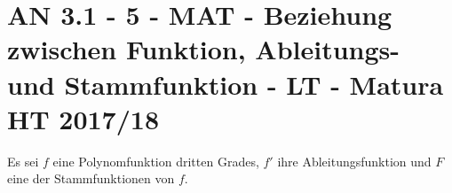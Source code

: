 \section{AN 3.1 - 5 - MAT - Beziehung zwischen Funktion, Ableitungs- und Stammfunktion - LT - Matura HT 2017/18}

\begin{beispiel}[AN 3.1]{1} %
Es sei $f$ eine Polynomfunktion dritten Grades, $f'$ ihre Ableitungsfunktion und $F$ eine der Stammfunktionen von $f$.

\end{beispiel}